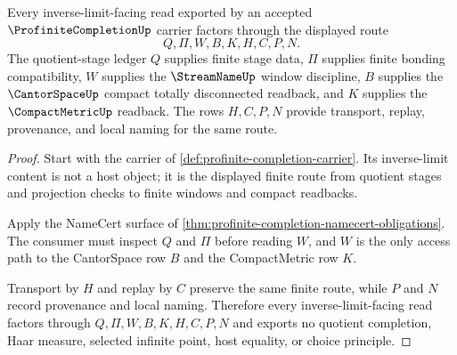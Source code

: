 \begin{theorem}
\label{thm:profinite-completion-inverse-limit-route}
Every inverse-limit-facing read exported by an accepted $\ProfiniteCompletionUp$ carrier factors through the displayed route
$$
Q,\Pi,W,B,K,H,C,P,N .
$$
The quotient-stage ledger $Q$ supplies finite stage data, $\Pi$ supplies finite bonding compatibility, $W$ supplies the $\StreamNameUp$ window discipline, $B$ supplies the $\CantorSpaceUp$ compact totally disconnected readback, and $K$ supplies the $\CompactMetricUp$ readback. The rows $H,C,P,N$ provide transport, replay, provenance, and local naming for the same route.
\end{theorem}
\begin{proof}
Start with the carrier of \autoref{def:profinite-completion-carrier}. Its inverse-limit content is not a host object; it is the displayed finite route from quotient stages and projection checks to finite windows and compact readbacks.

Apply the NameCert surface of \autoref{thm:profinite-completion-namecert-obligations}. The consumer must inspect $Q$ and $\Pi$ before reading $W$, and $W$ is the only access path to the CantorSpace row $B$ and the CompactMetric row $K$.

Transport by $H$ and replay by $C$ preserve the same finite route, while $P$ and $N$ record provenance and local naming. Therefore every inverse-limit-facing read factors through $Q,\Pi,W,B,K,H,C,P,N$ and exports no quotient completion, Haar measure, selected infinite point, host equality, or choice principle.
\end{proof}


\begin{closurestatus}{\ProfiniteCompletionUp}
  \theoryclosure{\seedClosure}
  \formalstatus{\unformalizedV}
\end{closurestatus}
